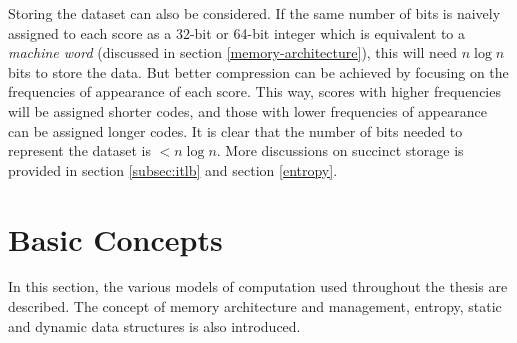 Storing the dataset can also be considered. If the same number of bits is naively assigned to each score as a 32-bit or 64-bit integer which is equivalent to a \textit{machine word} (discussed in section \ref{memory-architecture}), this will need $n\log n$ bits to store the data. But better compression can be achieved by focusing on the frequencies of appearance of each score. This way, scores with higher frequencies will be assigned shorter codes, and those with lower frequencies of appearance can be assigned longer codes. It is clear that the number of bits needed to represent the dataset is $< n\log n$. More discussions on succinct storage is provided in section \ref{subsec:itlb} and section \ref{entropy}.
\section{Basic Concepts}
In this section, the various models of computation used throughout the thesis are described. The concept of memory architecture and management, entropy, static and dynamic data structures is also introduced.
